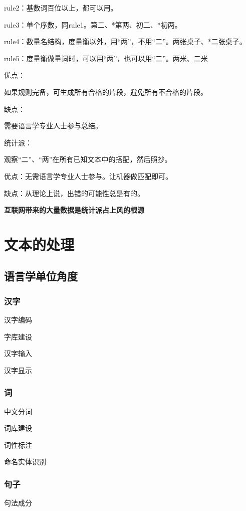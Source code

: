 \documentclass{ctexart}
\begin{document}
rule2：基数词百位以上，都可以用。

rule3：单个序数，同rule1。第二、*第两、初二、*初两。

rule4：数量名结构，度量衡以外，用“两”，不用“二”。两张桌子、*二张桌子。

rule5：度量衡做量词时，可以用“两”，也可以用“二”。两米、二米

优点：

如果规则完备，可生成所有合格的片段，避免所有不合格的片段。

缺点：

需要语言学专业人士参与总结。

统计派：

观察“二”、“两”在所有已知文本中的搭配，然后照抄。

优点：无需语言学专业人士参与。让机器做匹配即可。

缺点：从理论上说，出错的可能性总是有的。

\vspace{\baselineskip}

\textbf{互联网带来的大量数据是统计派占上风的根源}

\section{文本的处理}
\subsection{语言学单位角度}
\subsubsection{汉字}
汉字编码

字库建设

汉字输入

汉字显示

\subsubsection{词}

中文分词

词库建设

词性标注

命名实体识别

\subsubsection{句子}

句法成分
\end{document}

